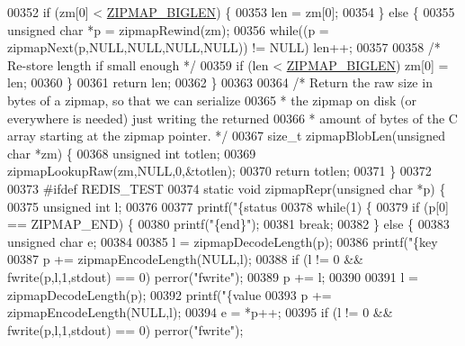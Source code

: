 \begin{DoxyCode}
{{00352     \textcolor{keywordflow}{if} (zm[0] < \hyperlink{zipmap_8c_a1173592dbfaa84c6b2419d0a699c97f5}{ZIPMAP\_BIGLEN}) \{
00353         len = zm[0];
00354     \} \textcolor{keywordflow}{else} \{
00355         \textcolor{keywordtype}{unsigned} \textcolor{keywordtype}{char} *p = zipmapRewind(zm);
00356         \textcolor{keywordflow}{while}((p = zipmapNext(p,NULL,NULL,NULL,NULL)) != NULL) len++;
00357 
00358         \textcolor{comment}{/* Re-store length if small enough */}
00359         \textcolor{keywordflow}{if} (len < \hyperlink{zipmap_8c_a1173592dbfaa84c6b2419d0a699c97f5}{ZIPMAP\_BIGLEN}) zm[0] = len;
00360     \}
00361     \textcolor{keywordflow}{return} len;
00362 \}
00363 
00364 \textcolor{comment}{/* Return the raw size in bytes of a zipmap, so that we can serialize}
00365 \textcolor{comment}{ * the zipmap on disk (or everywhere is needed) just writing the returned}
00366 \textcolor{comment}{ * amount of bytes of the C array starting at the zipmap pointer. */}
00367 size\_t zipmapBlobLen(\textcolor{keywordtype}{unsigned} \textcolor{keywordtype}{char} *zm) \{
00368     \textcolor{keywordtype}{unsigned} \textcolor{keywordtype}{int} totlen;
00369     zipmapLookupRaw(zm,NULL,0,&totlen);
00370     \textcolor{keywordflow}{return} totlen;
00371 \}
00372 
00373 \textcolor{preprocessor}{#}\textcolor{preprocessor}{ifdef} \textcolor{preprocessor}{REDIS\_TEST}
00374 \textcolor{keyword}{static} \textcolor{keywordtype}{void} zipmapRepr(\textcolor{keywordtype}{unsigned} \textcolor{keywordtype}{char} *p) \{
00375     \textcolor{keywordtype}{unsigned} \textcolor{keywordtype}{int} l;
00376 
00377     printf(\textcolor{stringliteral}{"\{status %
00378     \textcolor{keywordflow}{while}(1) \{
00379         \textcolor{keywordflow}{if} (p[0] == ZIPMAP\_END) \{
00380             printf(\textcolor{stringliteral}{"\{end\}"});
00381             \textcolor{keywordflow}{break};
00382         \} \textcolor{keywordflow}{else} \{
00383             \textcolor{keywordtype}{unsigned} \textcolor{keywordtype}{char} e;
00384 
00385             l = zipmapDecodeLength(p);
00386             printf(\textcolor{stringliteral}{"\{key %
00387             p += zipmapEncodeLength(NULL,l);
00388             \textcolor{keywordflow}{if} (l != 0 && fwrite(p,l,1,stdout) == 0) perror(\textcolor{stringliteral}{"fwrite"});
00389             p += l;
00390 
00391             l = zipmapDecodeLength(p);
00392             printf(\textcolor{stringliteral}{"\{value %
00393             p += zipmapEncodeLength(NULL,l);
00394             e = *p++;
00395             \textcolor{keywordflow}{if} (l != 0 && fwrite(p,l,1,stdout) == 0) perror(\textcolor{stringliteral}{"fwrite"});
}}}}}
\end{DoxyCode}
